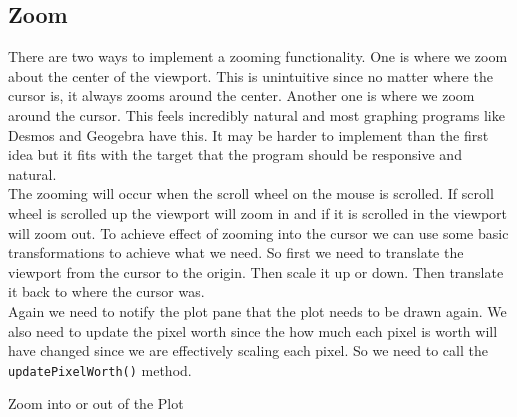 \documentclass[../../../../main.tex]{subfiles}
\begin{document}
\subsection{Zoom}
There are two ways to implement a zooming functionality. One is where we zoom about the center of the viewport. This is unintuitive since no matter where the cursor is, it always zooms around the center. Another one is where we zoom around the cursor. This feels incredibly natural and most graphing programs like Desmos and Geogebra have this. It may be harder to implement than the first idea but it fits with the target that the program should be responsive and natural.\\
The zooming will occur when the scroll wheel on the mouse is scrolled. If scroll wheel is scrolled up the viewport will zoom in and if it is scrolled in the viewport will zoom out. To achieve effect of zooming into the cursor we can use some basic transformations to achieve what we need. So first we need to translate the viewport from the cursor to the origin. Then scale it up or down. Then translate it back to where the cursor was.\\
Again we need to notify the plot pane that the plot needs to be drawn again. We also need to update the pixel worth since the how much each pixel is worth will have changed since we are effectively scaling each pixel. So we need to call the \texttt{updatePixelWorth()} method.
\begin{algorithm}
\DontPrintSemicolon
\caption{Zoom into or out of the Plot}
\end{algorithm}
\newpage
\end{document}
